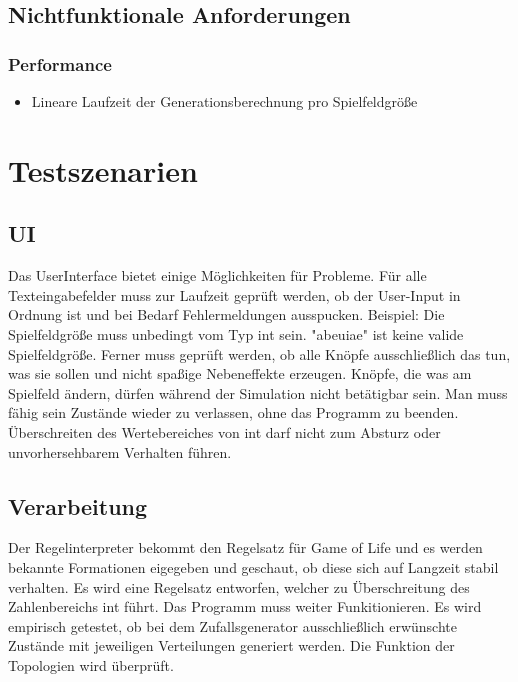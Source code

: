 \documentclass[11pt,a4paper]{article}
\begin{document}
 
\subsection{Nichtfunktionale Anforderungen}
\subsubsection{Performance}
\begin{itemize}
    \item Lineare Laufzeit der Generationsberechnung pro Spielfeldgröße
\end{itemize}

\pagebreak

\section{Testszenarien}
\subsection{UI}

Das UserInterface bietet einige Möglichkeiten für Probleme. Für alle Texteingabefelder muss zur Laufzeit geprüft werden, ob der User-Input in Ordnung ist und bei Bedarf Fehlermeldungen ausspucken. Beispiel: Die Spielfeldgröße muss unbedingt vom Typ int sein. "abeuiae" ist keine valide Spielfeldgröße.
Ferner muss geprüft werden, ob alle Knöpfe ausschließlich das tun, was sie sollen und nicht spaßige Nebeneffekte erzeugen.
Knöpfe, die was am Spielfeld ändern, dürfen während der Simulation nicht betätigbar sein. Man muss fähig sein Zustände wieder zu verlassen, ohne das Programm zu beenden. Überschreiten des Wertebereiches von int darf nicht zum Absturz oder unvorhersehbarem Verhalten führen. 
\subsection{Verarbeitung}
Der Regelinterpreter bekommt den Regelsatz für Game of Life und es werden bekannte Formationen eigegeben und geschaut, ob diese sich auf Langzeit stabil verhalten. 
Es wird eine Regelsatz entworfen, welcher zu Überschreitung des Zahlenbereichs int führt. Das Programm muss weiter Funkitionieren.
Es wird empirisch getestet, ob bei dem Zufallsgenerator ausschließlich erwünschte Zustände mit jeweiligen Verteilungen generiert werden.
Die Funktion der Topologien wird überprüft.
\end{document}
